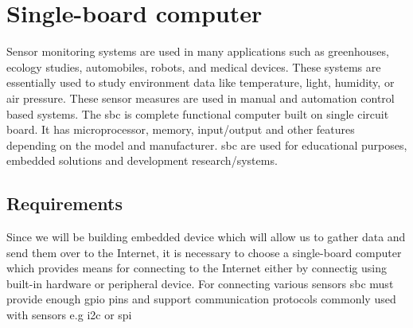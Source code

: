 
\section{Single-board computer}
Sensor monitoring systems are used in many applications such as greenhouses, ecology studies, automobiles, robots, and medical devices. These systems are essentially used to study environment data like temperature, light, humidity, or air pressure. These sensor measures are used in manual and automation control based systems\cite{6028693}. The \gls{sbc} is complete functional computer built on single circuit board. It has microprocessor, memory, input/output and other features depending on the model and manufacturer. \gls{sbc} are used for educational purposes, embedded solutions and development research/systems. \\
\subsection{Requirements} %
\label{sub:subsection_name}
Since we will be building embedded device which will allow us to gather data and send them over to the Internet, it is necessary to choose a single-board computer which provides means for connecting to the Internet either by connectig using built-in hardware or peripheral device. For connecting various sensors \gls{sbc} must provide enough \gls{gpio} pins and support communication protocols commonly used with sensors e.g \gls{i2c} or \gls{spi}

